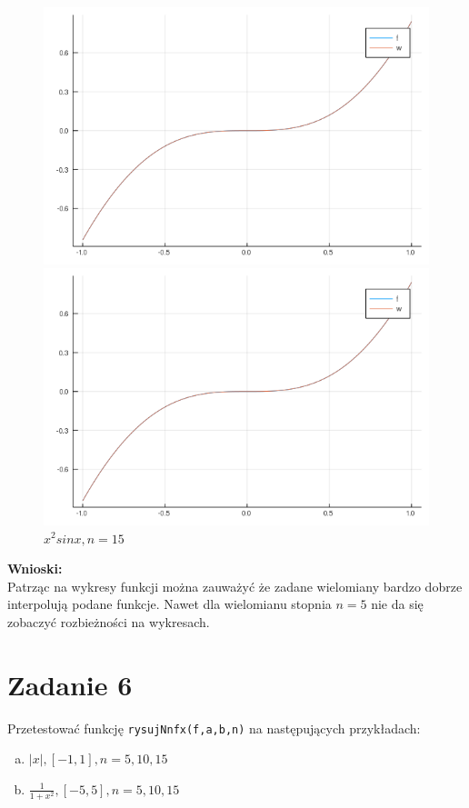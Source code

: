 \documentclass[12pt]{article}
\begin{document}
\begin{figure}[!htb]
  \includegraphics[width=\linewidth]{myplot_2_10.png}
  \caption{$x^2sin x, n=10$}
\endminipage\hfill
{}
  \includegraphics[width=\linewidth]{myplot_2_15.png}
  \caption{$x^2sin x, n=15$}
\endminipage
\end{figure}



\clearpage
\noindent \textbf{Wnioski:}\\
Patrząc na wykresy funkcji można zauważyć że zadane wielomiany bardzo dobrze interpolują podane funkcje. Nawet dla wielomianu stopnia $n=5$ nie da się zobaczyć rozbieżności na wykresach.

\section{Zadanie 6}
Przetestować funkcję \texttt{rysujNnfx(f,a,b,n)} na następujących przykładach:
\begin{enumerate}[(a)]
	\item $|x|, [-1,1], n=5,10,15$
	\item $\frac{1}{1+x^2}, [-5, 5], n=5,10,15$
\end{enumerate}
\end{document}
